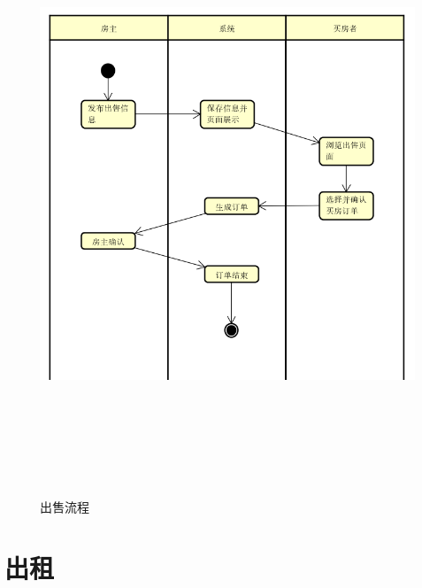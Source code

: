\begin{figure}[htbp]

    \centering
    
    \includegraphics[height=18.0cm,width=14.0cm]{requirement/figures/chushou.png}
    
    \caption{出售流程}
    
    \end{figure}
    \newpage
\section{出租}

